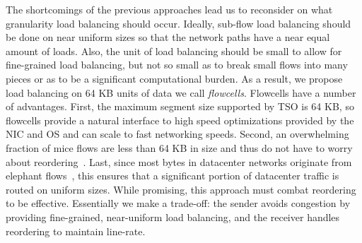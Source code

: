 The shortcomings of the previous approaches lead us to reconsider on what granularity
load balancing should occur. 
Ideally, sub-flow load balancing should be done on near uniform sizes so that
the network paths have a near equal amount of loads.
Also, the unit of load balancing should be small to
allow for fine-grained load balancing, but not so small as to break small flows into 
many pieces or as to be a significant computational burden. As a result, we
propose load balancing on 64 KB units of data we call {\em flowcells}. Flowcells
have a number of advantages. First, the maximum segment size supported by TSO
is 64 KB, so flowcells provide a natural interface to high speed optimizations provided
by the NIC and OS and can scale to fast networking speeds. Second, an overwhelming fraction of mice flows are less than 64 KB in size
 and thus do not have to worry about reordering~\cite{benson10,vl2,kandula2009nature}.
Last, since most bytes in datacenter networks originate from elephant flows~\cite{kandula2009nature,benson10,dctcp},
this ensures that a significant portion of datacenter traffic is routed on uniform
sizes. While promising, this approach must combat reordering to be effective. 
Essentially we make a trade-off: 
the sender avoids congestion by providing fine-grained, near-uniform load balancing,
and the receiver handles reordering to maintain line-rate.



